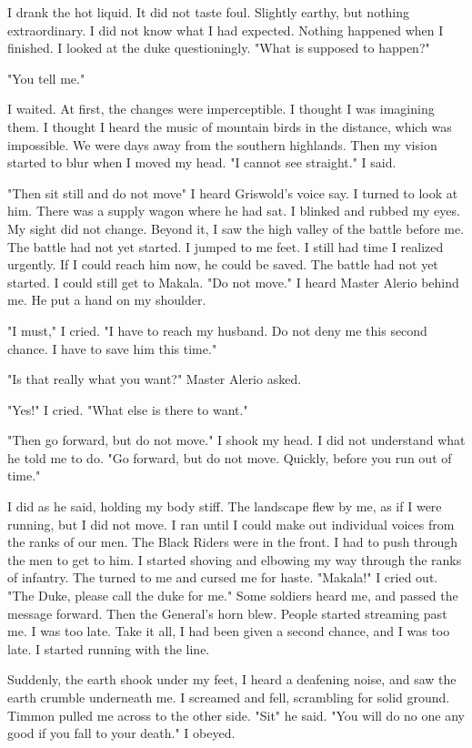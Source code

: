 \documentclass{article}
\begin{document}
I drank the hot liquid. It did not taste foul. Slightly earthy, but nothing extraordinary. I did not know what I had expected. Nothing happened when I finished. I looked at the duke questioningly. "What is supposed to happen?"

"You tell me."

I waited. At first, the changes were imperceptible. I thought I was imagining them. I thought I heard the music of mountain birds in the distance, which was impossible. We were days away from the southern highlands. Then my vision started to blur when I moved my head. "I cannot see straight." I said.

"Then sit still and do not move" I heard Griswold's voice say. I turned to look at him. There was a supply wagon where he had sat. I blinked and rubbed my eyes. My sight did not change. Beyond it, I saw the high valley of the battle before me. The battle had not yet started. I jumped to me feet. I still had time I realized urgently. If I could reach him now, he could be saved. The battle had not yet started. I could still get to Makala. "Do not move." I heard Master Alerio behind me. He put a hand on my shoulder. 

"I must," I cried. "I have to reach my husband. Do not deny me this second chance. I have to save him this time." 

"Is that really what you want?" Master Alerio asked.

"Yes!" I cried. "What else is there to want."

"Then go forward, but do not move." I shook my head. I did not understand what he told me to do. "Go forward, but do not move. Quickly, before you run out of time."

I did as he said, holding my body stiff. The landscape flew by me, as if I were running, but I did not move. I ran until I could make out individual voices from the ranks of our men. The Black Riders were in the front. I had to push through the men to get to him. I started shoving and elbowing my way through the ranks of infantry. The turned to me and cursed me for haste. "Makala!" I cried out. "The Duke, please call the duke for me." Some soldiers heard me, and passed the message forward. Then the General's horn blew. People started streaming past me. I was too late. Take it all, I had been given a second chance, and I was too late. I started running with the line. 

Suddenly, the earth shook under my feet, I heard a deafening noise, and saw the earth crumble underneath me. I screamed and fell, scrambling for solid ground. Timmon pulled me across to the other side. "Sit" he said. "You will do no one any good if you fall to your death." I obeyed.
\end{document}
